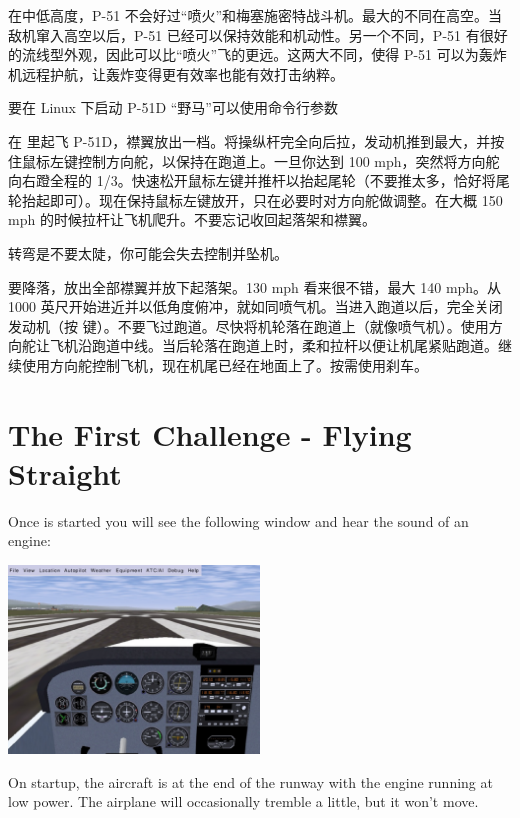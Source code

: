 在中低高度，P-51 不会好过“喷火”和梅塞施密特战斗机。最大的不同在高空。当敌机窜入高空以后，P-51 已经可以保持效能和机动性。另一个不同，P-51 有很好的流线型外观，因此可以比“喷火”飞的更远。这两大不同，使得 P-51 可以为轰炸机远程护航，让轰炸变得更有效率也能有效打击纳粹。

要在 Linux 下启动 P-51D “野马”可以使用命令行参数 

在 \FlightGear{} 里起飞 P-51D，襟翼放出一档。将操纵杆完全向后拉，发动机推到最大，并按住鼠标左键控制方向舵，以保持在跑道上。一旦你达到 100 mph，突然将方向舵向右蹬全程的 1/3。快速松开鼠标左键并推杆以抬起尾轮（不要推太多，恰好将尾轮抬起即可）。现在保持鼠标左键放开，只在必要时对方向舵做调整。在大概 150 mph 的时候拉杆让飞机爬升。不要忘记收回起落架和襟翼。

转弯是不要太陡，你可能会失去控制并坠机。

要降落，放出全部襟翼并放下起落架。130 mph 看来很不错，最大 140 mph。从 1000 英尺开始进近并以低角度俯冲，就如同喷气机。当进入跑道以后，完全关闭发动机（按 \key{\{} 键）。不要飞过跑道。尽快将机轮落在跑道上（就像喷气机）。使用方向舵让飞机沿跑道中线。当后轮落在跑道上时，柔和拉杆以便让机尾紧贴跑道。继续使用方向舵控制飞机，现在机尾已经在地面上了。按需使用刹车。




\iffalse
\section{The First Challenge - Flying Straight}
\label{sec:FlyingStraight}

Once \FlightGear{} is started you will see the following window and hear the
sound of an engine:

\begin{center}
\includegraphics[width=0.5\textwidth]{img/tut_6}
\end{center}

On startup, the aircraft is at the end of the runway with the engine running
at low power. The airplane will occasionally tremble a little, but it won't
move.

